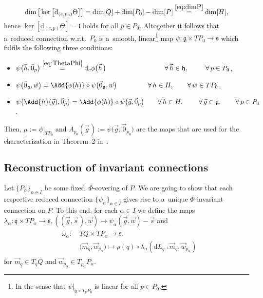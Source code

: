 \documentclass[pdftex]{sigma}
\numberwithin{equation}{section}
\begin{document}
\begin{Example}
\begin{gather*}
\dim\big[\ker\big[\mathrm{d}_{(e,p_0)}\Theta\big]\big]= \dim[Q] +
\dim[P_0]-\dim[P]\stackrel{\eqref{eq:dimP}}{=}\dim[H],
\end{gather*}
hence $\ker[\mathrm{d}_{(e,p)}\Theta]=\mathfrak{l}$ holds for all $p\in P_0$.
Altogether it follows that a~reduced connection w.r.t.~$P_0$ is a~smooth, linear\footnote{In the sense that
$\psi|_{\mathfrak{g}\times T_pP_0}$ is linear for all $p\in P_0$.} map $\psi\colon \mathfrak{g}\times TP_0\rightarrow
\mathfrak{s}$ which fulf\/ils the following three conditions:
\begin{itemize}\itemsep=0pt
\item[$i'')$]
$\psi\big(\vec{h},\vec{0}_{p}\big) \stackrel{\eqref{eq:ThetaPhi}}{=} \mathrm{d}_e\phi\big(\vec{h}\hspace{1pt}\big)
\hspace*{30.3mm}
\forall\, \vec{h}\in \mathfrak{h}, \hspace*{8.9mm}\forall\, p\in P_0$,
\item[$ii'')$]
$\psi\big(\vec{0}_{\mathfrak{g}},\vec{w}\big)=\Add{\phi(h)}\circ
\psi\big(\vec{0}_{\mathfrak{g}},\vec{w}\big)
\hspace*{16mm}
\forall\, h\in H, \qquad\forall\, \vec{w}\in TP_0$,
\item[$iii'')$]
$\psi\big(\Add{h}(\vec{g}),\vec{0}_{p}\big)=\Add{\phi(h)}\circ \psi\big(\vec{g},\vec{0}_{p}\big)
\qquad
\forall\, h\in H, \hspace*{7.7mm}\forall\, \vec{g}\in\mathfrak{g}, \qquad\forall\, p\in P_0$.
\end{itemize}
Then, $\mu:= \psi|_{TP_0}$ and $A_{p_0}(\vec{g}\hspace{1pt}):=\psi\big(\vec{g},\vec{0}_{p_0}\big)$
are the maps that are used for the characterization in Theorem~2 in~\cite{HarSni}.
\end{Example}

\subsection{Reconstruction of invariant connections}\label{subsec:Reconstruc}

Let $\{P_\alpha\}_{\alpha\in I}$ be some fixed~$\Phi$-covering of $P$.
We are going to show that each respective reduced connection $\{\psi_\alpha\}_{\alpha\in I}$ gives rise to a~unique
$\Phi$-invariant connection on $P$.
To this end, for each $\alpha\in I$ we def\/ine the maps $\lambda_\alpha\colon \mathfrak{q}\times TP_\alpha\rightarrow
\mathfrak{s}, ((\vec{g},\vec{s}\hspace{1pt}),\vec{w})\mapsto\psi_\alpha(\vec{g},\vec{w})-\vec{s}$ and
\begin{gather*}
\begin{split}
&\omega_\alpha\colon\quad TQ\times TP_\alpha  \rightarrow  \mathfrak{s},
\\
&\phantom{\omega_\alpha\colon\quad {}}
\big(\vec{m}_q,\vec{w}_{p_\alpha}\big) \mapsto  \rho(q)\circ \lambda_\alpha\left(\mathrm{d}
L_{q^{-1}}\vec{m}_q,\vec{w}_{p_\alpha}\right)
\end{split}
\end{gather*}
for $\vec{m}_q\in T_qQ$ and $\vec{w}_{p_\alpha}\in T_{p_\alpha}P_\alpha$.
\end{document}
